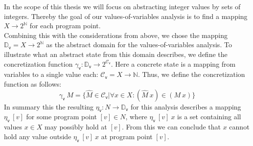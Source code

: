     In the scope of this thesis we will focus on abstracting integer values by sets of integers. Thereby the goal of our values-of-variables analysis is to find a mapping $X \rightarrow 2^\mathbb{N}$ for each program point.\\
    Combining this with the considerations from above, we chose the mapping $\mathbb{D}_\textsf{v} = X \rightarrow 2^\mathbb{N}$ as the abstract domain for the values-of-variables analysis. To illustrate what an abstract state from this domain describes, we define the concretization function $\gamma_\textsf{v}: \mathbb{D}_\textsf{v} \rightarrow 2^{\mathcal{C}_\textsf{v}}$. Here a concrete state is a mapping from variables to a single value each: $\mathcal{C}_\textsf{v} = X \rightarrow \mathbb{N}$. Thus, we define the concretization function as follows:
    \[ \gamma_\textsf{v}\ M = \{ \widehat{M} \in \mathcal{C}_\textsf{v} | \forall x \in X: (\widehat{M}\ x) \in (M\ x) \} \]
    In summary this the resulting $\eta_\textsf{v}: N \rightarrow \mathbb{D}_\textsf{v}$ for this analysis describes a mapping $\eta_\textsf{v}\ [v]$ for some program point $[v] \in N$, where $\eta_\textsf{v}\ [v]\ x$ is a set containing all values $x \in X$ may possibly hold at $[v]$. From this we can conclude that $x$ cannot hold any value outside $\eta_\textsf{v}\ [v]\ x$ at program point $[v]$. 

